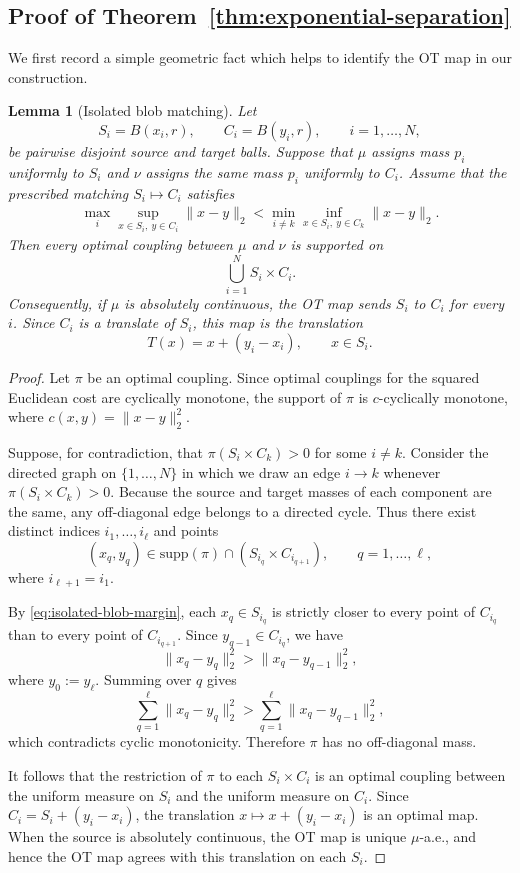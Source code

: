 \documentclass[11pt,twoside]{article}
\newtheorem{lemma}{Lemma}
\begin{document}
\subsection{Proof of Theorem~\ref{thm:exponential-separation}}

We first record a simple geometric fact which helps to identify the OT map
in our construction.

\begin{lemma}[Isolated blob matching]
\label{lem:isolated-blob-matching}
Let
\[
S_i=B(x_i,r),\qquad C_i=B(y_i,r),\qquad i=1,\ldots,N,
\]
be pairwise disjoint source and target balls. Suppose that $\mu$ assigns
mass $p_i$ uniformly to $S_i$ and $\nu$ assigns the same mass $p_i$
uniformly to $C_i$. Assume that the prescribed matching $S_i\mapsto C_i$
satisfies
\begin{align}
\label{eq:isolated-blob-margin}
\max_i \sup_{x\in S_i,\ y\in C_i}\|x-y\|_2
<
\min_{i\neq k}\inf_{x\in S_i,\ y\in C_k}\|x-y\|_2 .
\end{align}
Then every optimal coupling between $\mu$ and $\nu$ is supported on
\[
\bigcup_{i=1}^N S_i\times C_i.
\]
Consequently, if $\mu$ is absolutely continuous, the OT map sends
$S_i$ to $C_i$ for every $i$. Since $C_i$ is a translate of $S_i$, this
map is the translation
\[
T(x)=x+(y_i-x_i),\qquad x\in S_i.
\]
\end{lemma}

\begin{proof}
Let $\pi$ be an optimal coupling. Since optimal couplings for the squared
Euclidean cost are cyclically monotone, the support of $\pi$ is
$c$-cyclically monotone, where $c(x,y)=\|x-y\|_2^2$.

Suppose, for contradiction, that $\pi(S_i\times C_k)>0$ for some
$i\neq k$. Consider the directed graph on $\{1,\ldots,N\}$ in which we
draw an edge $i\to k$ whenever $\pi(S_i\times C_k)>0$. Because the
source and target masses of each component are the same, any off-diagonal
edge belongs to a directed cycle. Thus there exist distinct indices
$i_1,\ldots,i_\ell$ and points
\[
(x_q,y_q)\in \text{supp}(\pi)\cap (S_{i_q}\times C_{i_{q+1}}),
\qquad q=1,\ldots,\ell,
\]
where $i_{\ell+1}=i_1$.

By \eqref{eq:isolated-blob-margin}, each $x_q\in S_{i_q}$ is strictly
closer to every point of $C_{i_q}$ than to every point of
$C_{i_{q+1}}$. Since $y_{q-1}\in C_{i_q}$, we have
\[
\|x_q-y_q\|_2^2>\|x_q-y_{q-1}\|_2^2,
\]
where $y_0:=y_\ell$. Summing over $q$ gives
\[
\sum_{q=1}^\ell \|x_q-y_q\|_2^2
>
\sum_{q=1}^\ell \|x_q-y_{q-1}\|_2^2,
\]
which contradicts cyclic monotonicity. Therefore $\pi$ has no
off-diagonal mass.

It follows that the restriction of $\pi$ to each $S_i\times C_i$ is an
optimal coupling between the uniform measure on $S_i$ and the uniform
measure on $C_i$. Since $C_i=S_i+(y_i-x_i)$, the translation
$x\mapsto x+(y_i-x_i)$ is an optimal map. When the source is absolutely
continuous, the OT map is unique $\mu$-a.e., and hence the OT
map agrees with this translation on each $S_i$.
\end{proof}
\end{document}
